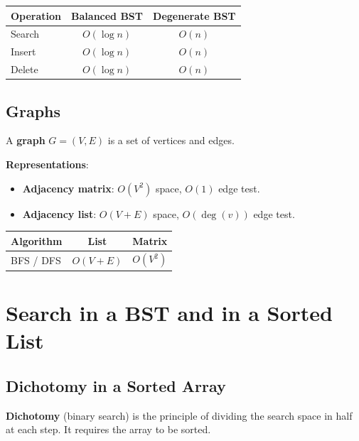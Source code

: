 \documentclass[11pt,a4paper]{article}
\begin{document}
\begin{center}
\begin{tabular}{lcc}
\toprule
Operation & Balanced BST & Degenerate BST \\
\midrule
Search & $O(\log n)$ & $O(n)$ \\
Insert & $O(\log n)$ & $O(n)$ \\
Delete & $O(\log n)$ & $O(n)$ \\
\bottomrule
\end{tabular}
\end{center}

\subsection{Graphs}

A \textbf{graph} $G = (V, E)$ is a set of vertices and edges.

\textbf{Representations}:
\begin{itemize}
    \item \textbf{Adjacency matrix}: $O(V^2)$ space, $O(1)$ edge test.
    \item \textbf{Adjacency list}: $O(V + E)$ space, $O(\deg(v))$ edge test.
\end{itemize}

\begin{center}
\begin{tabular}{lcc}
\toprule
Algorithm & List & Matrix \\
\midrule
BFS / DFS & $O(V + E)$ & $O(V^2)$ \\
\bottomrule
\end{tabular}
\end{center}

\section{Search in a BST and in a Sorted List}

\subsection{Dichotomy in a Sorted Array}

\textbf{Dichotomy} (binary search) is the principle of dividing the search space in half at each step. It requires the array to be sorted.
\end{document}
